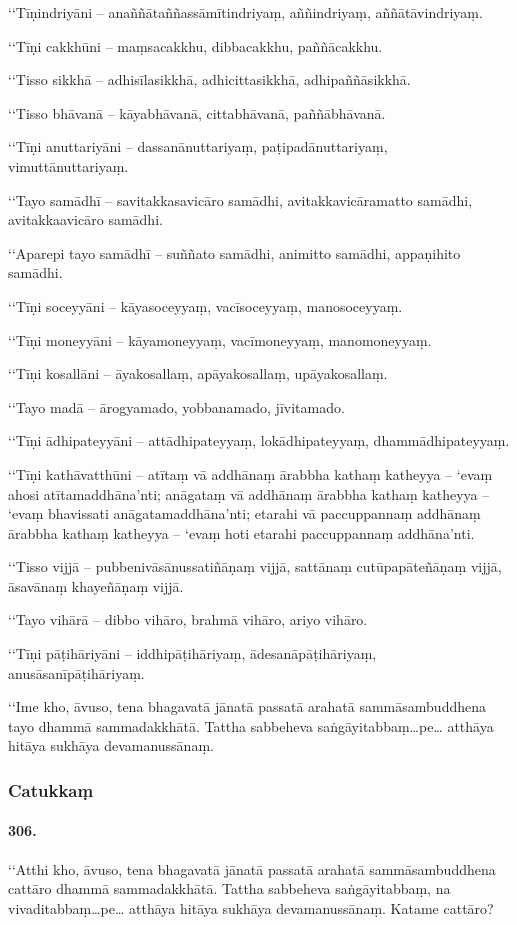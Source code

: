 ‘‘Tīṇindriyāni – anaññātaññassāmītindriyaṃ, aññindriyaṃ, aññātāvindriyaṃ.

‘‘Tīṇi cakkhūni – maṃsacakkhu, dibbacakkhu, paññācakkhu.

‘‘Tisso sikkhā – adhisīlasikkhā, adhicittasikkhā, adhipaññāsikkhā.

‘‘Tisso bhāvanā – kāyabhāvanā, cittabhāvanā, paññābhāvanā.

‘‘Tīṇi anuttariyāni – dassanānuttariyaṃ, paṭipadānuttariyaṃ, vimuttānuttariyaṃ.

‘‘Tayo samādhī – savitakkasavicāro samādhi, avitakkavicāramatto samādhi, avitakkaavicāro samādhi.

‘‘Aparepi tayo samādhī – suññato samādhi, animitto samādhi, appaṇihito samādhi.

‘‘Tīṇi soceyyāni – kāyasoceyyaṃ, vacīsoceyyaṃ, manosoceyyaṃ.

‘‘Tīṇi moneyyāni – kāyamoneyyaṃ, vacīmoneyyaṃ, manomoneyyaṃ.

‘‘Tīṇi kosallāni – āyakosallaṃ, apāyakosallaṃ, upāyakosallaṃ.

‘‘Tayo madā – ārogyamado, yobbanamado, jīvitamado.

‘‘Tīṇi ādhipateyyāni – attādhipateyyaṃ, lokādhipateyyaṃ, dhammādhipateyyaṃ.

‘‘Tīṇi kathāvatthūni – atītaṃ vā addhānaṃ ārabbha kathaṃ katheyya – ‘evaṃ ahosi atītamaddhāna’nti; anāgataṃ vā addhānaṃ ārabbha kathaṃ katheyya – ‘evaṃ bhavissati anāgatamaddhāna’nti; etarahi vā paccuppannaṃ addhānaṃ ārabbha kathaṃ katheyya – ‘evaṃ hoti etarahi paccuppannaṃ addhāna’nti.

‘‘Tisso vijjā – pubbenivāsānussatiñāṇaṃ vijjā, sattānaṃ cutūpapāteñāṇaṃ vijjā, āsavānaṃ khayeñāṇaṃ vijjā.

‘‘Tayo vihārā – dibbo vihāro, brahmā vihāro, ariyo vihāro.

‘‘Tīṇi pāṭihāriyāni – iddhipāṭihāriyaṃ, ādesanāpāṭihāriyaṃ, anusāsanīpāṭihāriyaṃ.

‘‘Ime kho, āvuso, tena bhagavatā jānatā passatā arahatā sammāsambuddhena tayo dhammā sammadakkhātā. Tattha sabbeheva saṅgāyitabbaṃ…pe… atthāya hitāya sukhāya devamanussānaṃ.

\subsubsection{Catukkaṃ}

\paragraph{306.} ‘‘Atthi kho, āvuso, tena bhagavatā jānatā passatā arahatā sammāsambuddhena cattāro dhammā sammadakkhātā. Tattha sabbeheva saṅgāyitabbaṃ, na vivaditabbaṃ…pe… atthāya hitāya sukhāya devamanussānaṃ. Katame cattāro?

